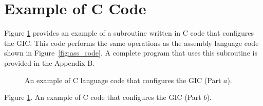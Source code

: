 \documentclass[11pt, twoside, pdftex]{article}
\newcommand{\commonPath}{../../Common}
\begin{document}
\newpage
\section{Example of C Code}
\label{sec:C_code} Figure \ref{fig:C_code} provides an example of a subroutine written in
C code that configures the GIC. This code performs the same operations as the assembly
language code shown in Figure~\ref{fig:ass_code}.  A complete program that uses 
this subroutine is provided in the Appendix B.

\begin{figure}[h!]
\begin{center}

\end{center}
\caption{An example of C language code that configures the GIC (Part $a$).}
   \label{fig:C_code}
\end{figure}

\clearpage
\begin{center}

\end{center}
\begin{center}
Figure \ref{fig:C_code}. An example of C code that configures the GIC (Part $b$).
\end{center}

\newpage
{}





\newpage
{}







\end{document}

